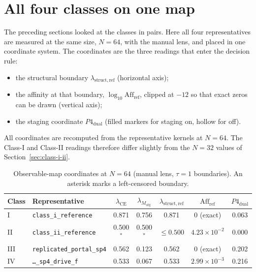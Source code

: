 \section{All four classes on one map}
\label{sec:observable-map-support}

The preceding sections looked at the classes in pairs. Here all four representatives are measured at the same size, $N=64$, with the manual lens, and placed in one coordinate system. The coordinates are the three readings that enter the decision rule:
\begin{itemize}
  \item the structural boundary $\lambda_{\mathrm{struct,ref}}$ (horizontal axis);
  \item the affinity at that boundary, $\log_{10}\mathrm{Aff}_{\mathrm{ref}}$, clipped at $-12$ so that exact zeros can be drawn (vertical axis);
  \item the staging coordinate $P4_{\mathrm{dual}}$ (filled markers for staging on, hollow for off).
\end{itemize}
All coordinates are recomputed from the representative kernels at $N=64$. The Class-I and Class-II readings therefore differ slightly from the $N=32$ values of Section~\ref{sec:class-i-ii}.

\begin{table}[tbp]
\centering
\small
\caption{Observable-map coordinates at $N=64$ (manual lens, $\tau=1$ boundaries). An asterisk marks a left-censored boundary.}
\label{tab:four-class-observable-coordinates}
\setlength{\tabcolsep}{4.5pt}
\begin{tabular}{@{}llccccc@{}}
\toprule
Class & Representative
  & $\lambda_{\mathrm{CE}}$
  & $\lambda_{M_{\mathrm{obj}}}$
  & $\lambda_{\mathrm{struct,ref}}$
  & $\mathrm{Aff}_{\mathrm{ref}}$
  & $P4_{\mathrm{dual}}$ \\
\midrule
I   & \texttt{class\_i\_reference}   & 0.871 & 0.756 & 0.871 & $0$ (exact)          & 0.063 \\
II  & \texttt{class\_ii\_reference}  & 0.500$^{*}$ & 0.500$^{*}$ & $\le 0.500$ & $4.23\times 10^{-2}$ & 0.000 \\
III & \texttt{replicated\_portal\_sp4} & 0.562 & 0.123 & 0.562 & $0$ (exact)          & 0.202 \\
IV  & \texttt{\ldots\_sp4\_drive\_f}   & 0.533 & 0.067 & 0.533 & $2.99\times 10^{-3}$ & 0.216 \\
\bottomrule
\end{tabular}
\end{table}

